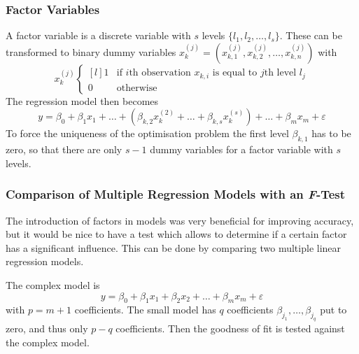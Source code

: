 \documentclass[11pt]{article}
\theoremstyle{definition}
\begin{document}
\subsubsection{Factor Variables}
A factor variable is a discrete variable with $s$ levels $\{l_1, l_2,\dots,l_s\}$. These can be transformed to binary dummy variables $x_k^{(j)} = (x_{k,1}^{(j)}, x_{k,2}^{(j)}, \dots, x_{k,n}^{(j)})$ with
\begin{equation*}
	x_k^{(j)} \left\{
		\begin{matrix*}[l]
			1 & \text{if $i$th observation $x_{k,i}$ is equal to $j$th level $l_j$}\\
			0 & \text{otherwise}
		\end{matrix*}
	\right.
\end{equation*}
The regression model then becomes
\begin{equation*}
	y = \beta_0 + \beta_1x_1 + \dots + (\beta_{k,2}x_k^{(2)} + \dots + \beta_{k,s}x_k^{(s)}) + \dots + \beta_m x_m + \varepsilon
\end{equation*}
To force the uniqueness of the optimisation problem the first level $\beta_{k,1}$ has to be zero, so that there are only $s-1$ dummy variables for a factor variable with $s$ levels.

\subsubsection{Comparison of Multiple Regression Models with an \textit{F}-Test}
The introduction of factors in models was very beneficial for improving accuracy, but it would be nice to have a test which allows to determine if a certain factor has a significant influence. This can be done by comparing two multiple linear regression models.

The complex model is
\begin{equation*}
	y = \beta_0 + \beta_1 x_1 + \beta_2 x_2 + \dots + \beta_m x_m + \varepsilon
\end{equation*}
with $p=m+1$ coefficients. The small model has $q$ coefficients $\beta_{j_1},\dots,\beta_{j_q}$ put to zero, and thus only $p-q$ coefficients. Then the goodness of fit is tested against the complex model.
\end{document}
